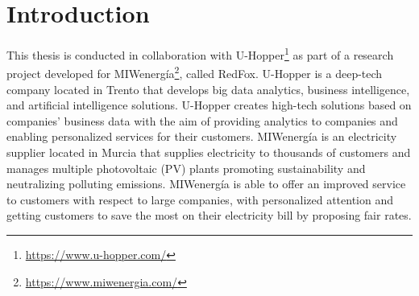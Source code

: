 \chapter{Introduction}
\label{cha:introduction}
\vspace{0.4 cm}

This thesis is conducted in collaboration with U-Hopper\footnote{ \url{https://www.u-hopper.com/} } as part of a research project developed for MIWenergía\footnote{ \url{https://www.miwenergia.com/} }, called RedFox.
U-Hopper is a deep-tech company located in Trento that develops big data analytics, business intelligence, and artificial intelligence solutions.
U-Hopper creates high-tech solutions based on companies' business data with the aim of providing analytics to companies and enabling personalized services for their customers.
MIWenergía is an electricity supplier located in Murcia that supplies electricity to thousands of customers and manages multiple photovoltaic (PV) plants promoting sustainability and neutralizing polluting emissions.
MIWenergía is able to offer an improved service to customers with respect to large companies, with personalized attention and getting customers to save the most on their electricity bill by proposing fair rates.

